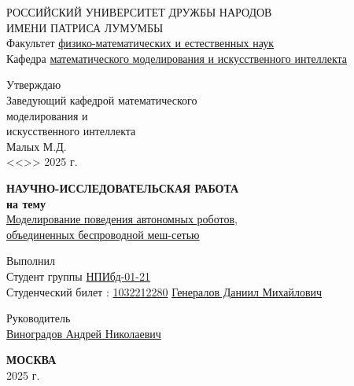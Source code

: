 \documentclass[%
]{report}
\begin{document}
\begin{titlepage}

  \begin{center}
  \hfill \break
  \large{РОССИЙСКИЙ УНИВЕРСИТЕТ ДРУЖБЫ НАРОДОВ}\\
  \large{ИМЕНИ ПАТРИСА ЛУМУМБЫ}\\
  \normalsize{Факультет \underline{физико-математических и естественных наук}}\\ 
  \normalsize{Кафедра \underline{математического моделирования и искусственного интеллекта}}\\

  \vspace*{\fill}

  \begin{flushright}
    \large{Утверждаю}\\
    \normalsize{Заведующий кафедрой} 
    \normalsize{математического \\ моделирования и \\ искусственного интеллекта \\} 
    \underline{\phantom{signature signature}} Малых М.Д. \\
    <<\underline{\phantom{day}}>> \underline{\phantom{month month}} 2025 г.
    \end{flushright}
 
  \vspace*{\fill}
  \Large{\textbf{НАУЧНО-ИССЛЕДОВАТЕЛЬСКАЯ РАБОТА\\ на тему}}
  \\
  \underline{Моделирование поведения автономных роботов,} \\
  \underline{объединенных беспроводной меш-сетью}
  \vspace*{\fill}
  
  \end{center}
   
   \begin{flushright}
    Выполнил \\
    Студент группы \underline{НПИбд-01-21}\\
    Студенческий билет \textnumero{}: \underline{1032212280}
    \underline{Генералов Даниил Михайлович \phantom{signature}}\\ \vspace{0.5cm}
   \end{flushright}

   \vspace*{\fill}

   \begin{flushright}
    Руководитель \\
    \underline{Виноградов Андрей Николаевич \phantom{signature}}\\ \vspace{0.5cm}
   \end{flushright}
   
  \begin{center} \textbf{МОСКВА} \\ 2025 г. \end{center}
  \thispagestyle{empty} %
   
  \end{titlepage}
   \newpage
   
\end{document}
